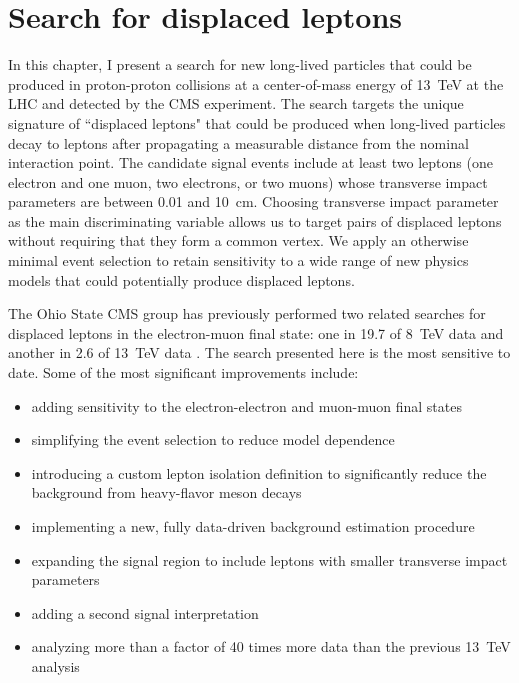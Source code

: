 \chapter{Search for displaced leptons}
\label{displaced_leptons}
In this chapter, I present a search for new long-lived particles that could be produced in proton-proton collisions at a center-of-mass energy of \SI{13}{\TeV} at the LHC and detected by the CMS experiment. The search targets the unique signature of ``displaced leptons" that could be produced when long-lived particles decay to leptons after propagating a measurable distance from the nominal interaction point. The candidate signal events include at least two leptons (one electron and one muon, two electrons, or two muons) whose transverse impact parameters are between \num{0.01} and \SI{10}{\cm}. Choosing transverse impact parameter as the main discriminating variable allows us to target pairs of displaced leptons without requiring that they form a common vertex. We apply an otherwise minimal event selection to retain sensitivity to a wide range of new physics models that could potentially produce displaced leptons.

The Ohio State CMS group has previously performed two related searches for displaced leptons in the electron-muon final state: one in \SI{19.7}{\fb} of \SI{8}{\TeV} data and another in \SI{2.6}{\fb} of \SI{13}{\TeV} data \cite{displaced_leptons_run1, displaced_leptons_bing}. The search presented here is the most sensitive to date. Some of the most significant improvements include:
\begin{itemize}
    \itemsep0em
    \item adding sensitivity to the electron-electron and muon-muon final states
    \item simplifying the event selection to reduce model dependence
    \item introducing a custom lepton isolation definition to significantly reduce the background from heavy-flavor meson decays
    \item implementing a new, fully data-driven background estimation procedure
    \item expanding the signal region to include leptons with smaller transverse impact parameters
    \item adding a second signal interpretation
    \item analyzing more than a factor of \num{40} times more data than the previous \SI{13}{\TeV} analysis \cite{displaced_leptons_bing}
\end{itemize}

